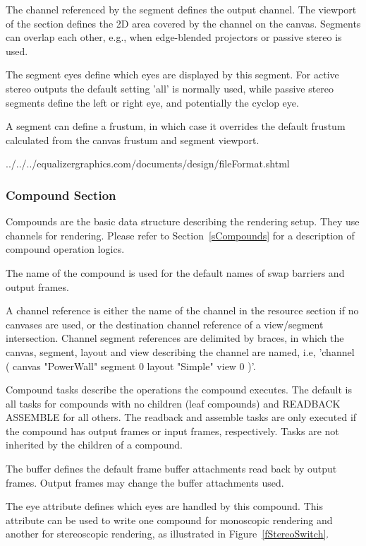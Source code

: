 \documentclass[10pt,a4]{scrartcl}
\newcommand{\fig}[1]{Figure~\ref{#1}}
\newcommand{\sref}[1]{Section~\ref{#1}}
\begin{document}
The channel referenced by the segment defines the output channel. The
viewport of the section defines the 2D area covered by the channel on
the canvas. Segments can overlap each other, e.g., when edge-blended
projectors or passive stereo is used.

The segment eyes define which eyes are displayed by this segment. For active
stereo outputs the default setting 'all' is normally used, while passive stereo
segments define the left or right eye, and potentially the cyclop eye.

A segment can define a frustum, in which case it overrides the default
frustum calculated from the canvas frustum and segment viewport.

{\footnotesize
  {../../../equalizergraphics.com/documents/design/fileFormat.shtml}}

\subsubsection{Compound Section}

Compounds are the basic data structure describing the rendering
setup. They use channels for rendering. Please refer to
\sref{sCompounds} for a description of compound operation logics.

The name of the compound is used for the default names of swap barriers
and output frames.

A channel reference is either the name of the channel in the resource
section if no canvases are used, or the destination channel reference of
a view/segment intersection. Channel segment references are delimited by
braces, in which the canvas, segment, layout and view describing the
channel are named, i.e, 'channel ( canvas "PowerWall" segment 0 layout
"Simple" view 0 )'.

Compound tasks describe the operations the compound executes. The
default is all tasks for compounds with no children (leaf compounds) and
\textsf{READBACK ASSEMBLE} for all others. The readback and assemble
tasks are only executed if the compound has output frames or input
frames, respectively. Tasks are not inherited by the children of a
compound.

The buffer defines the default frame buffer attachments read back by
output frames. Output frames may change the buffer attachments used.

The eye attribute defines which eyes are handled by this compound. This
attribute can be used to write one compound for monoscopic rendering and another
for stereoscopic rendering, as illustrated in \fig{fStereoSwitch}.
\end{document}
